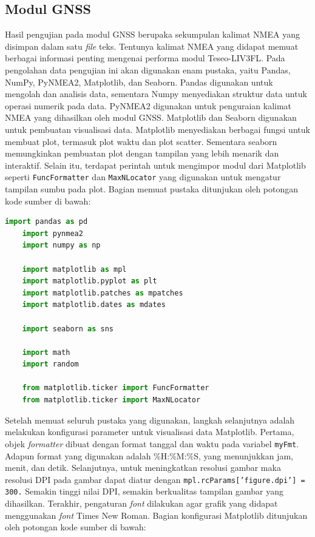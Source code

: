 \subsection{Modul GNSS}
Hasil pengujian pada modul GNSS berupaka sekumpulan kalimat NMEA yang disimpan dalam satu \textit{file} teks. Tentunya kalimat NMEA yang didapat memuat berbagai informasi penting mengenai performa modul Teseo-LIV3FL. Pada pengolahan data pengujian ini akan digunakan enam pustaka, yaitu Pandas, NumPy, PyNMEA2, Matplotlib, dan Seaborn. Pandas digunakan untuk mengolah dan analisis data, sementara Numpy menyediakan struktur data untuk operasi numerik pada data. PyNMEA2 digunakan untuk penguraian kalimat NMEA yang dihasilkan oleh modul GNSS. Matplotlib dan Seaborn digunakan untuk pembuatan visualisasi data. Matplotlib menyediakan berbagai fungsi untuk membuat plot, termasuk plot waktu dan plot scatter. Sementara seaborn memungkinkan pembuatan plot dengan tampilan yang lebih menarik dan interaktif. Selain itu, terdapat perintah untuk mengimpor modul dari Matplotlib seperti \texttt{FuncFormatter} dan \texttt{MaxNLocator} yang digunakan untuk mengatur tampilan sumbu pada plot. Bagian memuat pustaka ditunjukan oleh potongan kode sumber di bawah:

\begin{lstlisting}[language=python]
	import pandas as pd
	import pynmea2
	import numpy as np
	
	import matplotlib as mpl
	import matplotlib.pyplot as plt
	import matplotlib.patches as mpatches
	import matplotlib.dates as mdates
	
	import seaborn as sns
	
	import math
	import random
	
	from matplotlib.ticker import FuncFormatter
	from matplotlib.ticker import MaxNLocator
\end{lstlisting}

Setelah memuat seluruh pustaka yang digunakan, langkah selanjutnya adalah melakukan konfigurasi parameter untuk visualisasi data Matplotlib. Pertama, objek \textit{formatter} dibuat dengan format tanggal dan waktu pada variabel \texttt{myFmt}. Adapun format yang digunakan adalah \%H:\%M:\%S, yang menunjukkan jam, menit, dan detik. Selanjutnya, untuk meningkatkan resolusi gambar maka resolusi DPI pada gambar dapat diatur dengan \texttt{mpl.rcParams['figure.dpi'] = 300.} Semakin tinggi nilai DPI, semakin berkualitas tampilan gambar yang dihasilkan. Terakhir, pengaturan \textit{font} dilakukan agar grafik yang didapat menggunakan \textit{font} Times New Roman. Bagian konfigurasi Matplotlib ditunjukan oleh potongan kode sumber di bawah:

